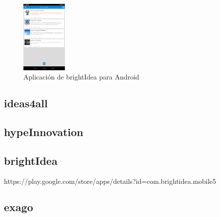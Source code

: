 \begin{figure}[!h]
\begin{center}
		\includegraphics[width=0.2\textwidth]{./img/competencia/brightIdea/6.png}
		\caption{Aplicación de brightIdea para Android}
		\label{fig:CORDOVAimg}
	\end{center}
\end{figure}

\subsection{ideas4all}
\subsection{hypeInnovation}
\subsection{brightIdea}
https://play.google.com/store/apps/details?id=com.brightidea.mobile5
\subsection{exago}

